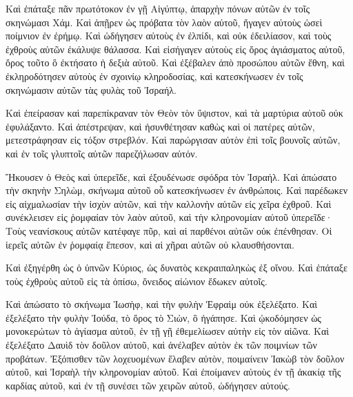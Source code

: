 {Καὶ ἐπάταξε πᾶν πρωτότοκον ἐν γῇ Αἰγύπτῳ, ἀπαρχὴν πόνων αὐτῶν ἐν τοῖς σκηνώμασι Χάμ.
Καὶ ἀπῇρεν ὡς πρόβατα τὸν λαὸν αὐτοῦ, ἤγαγεν αὐτοὺς ὡσεὶ ποίμνιον ἐν ἐρήμῳ.
Καὶ ὡδήγησεν αὐτοὺς ἐν ἐλπίδι, καὶ οὐκ ἐδειλίασον, καὶ τοὺς ἐχθροὺς αὐτῶν ἐκάλυψε θάλασσα.
Καὶ εἰσήγαγεν αὐτοὺς εἰς ὄρος ἁγιάσματος αὐτοῦ, ὄρος τοῦτο ὃ ἐκτήσατο ἡ δεξιὰ αὐτοῦ.
Καὶ ἐξέβαλεν ἀπὸ προσώπου αὐτῶν ἔθνη, καὶ ἐκληροδότησεν αὐτοὺς ἐν σχοινίῳ κληροδοσίας, καὶ κατεσκήνωσεν ἐν τοῖς σκηνώμασιν αὐτῶν τὰς φυλὰς τοῦ Ἰσραήλ.
\par }{\PP {}Καὶ ἐπείρασαν καὶ παρεπίκραναν τὸν Θεὸν τὸν ὕψιστον, καὶ τὰ μαρτύρια αὐτοῦ οὐκ ἐφυλάξαντο.
Καὶ ἀπέστρεψαν, καὶ ἠσυνθέτησαν καθὼς καὶ οἱ πατέρες αὐτῶν, μετεστράφησαν εἰς τόξον στρεβλόν.
Καὶ παρώργισαν αὐτὸν ἐπὶ τοῖς βουνοῖς αὐτῶν, καὶ ἐν τοῖς γλυπτοῖς αὐτῶν παρεζήλωσαν αὐτόν.
\par }{\PP {}Ἤκουσεν ὁ Θεὸς καὶ ὑπερεῖδε, καὶ ἐξουδένωσε σφόδρα τὸν Ἰσραήλ.
Καὶ ἀπώσατο τὴν σκηνὴν Σηλὼμ, σκήνωμα αὐτοῦ οὗ κατεσκήνωσεν ἐν ἀνθρώποις.
Καὶ παρέδωκεν εἰς αἰχμαλωσίαν τὴν ἰσχὺν αὐτῶν, καὶ τὴν καλλονὴν αὐτῶν εἰς χεῖρα ἐχθροῦ.
Καὶ συνέκλεισεν εἰς ῥομφαίαν τὸν λαὸν αὐτοῦ, καὶ τὴν κληρονομίαν αὐτοῦ ὑπερεῖδε·
Τοὺς νεανίσκους αὐτῶν κατέφαγε πῦρ, καὶ αἱ παρθένοι αὐτῶν οὐκ ἐπένθησαν.
Οἱ ἱερεῖς αὐτῶν ἐν ῥομφαίᾳ ἔπεσον, καὶ αἱ χῆραι αὐτῶν οὐ κλαυσθήσονται.
\par }{\PP {}Καὶ ἐξηγέρθη ὡς ὁ ὑπνῶν Κύριος, ὡς δυνατὸς κεκραιπαληκὼς ἐξ οἴνου.
Καὶ ἐπάταξε τοὺς ἐχθροὺς αὐτοῦ εἰς τὰ ὀπίσω, ὄνειδος αἰώνιον ἔδωκεν αὐτοῖς.
\par }{\PP {}Καὶ ἀπώσατο τὸ σκήνωμα Ἰωσὴφ, καὶ τὴν φυλὴν Ἐφραὶμ οὐκ ἐξελέξατο.
Καὶ ἐξελέξατο τὴν φυλὴν Ἰούδα, τὸ ὄρος τὸ Σιὼν, ὃ ἠγάπησε.
Καὶ ᾠκοδόμησεν ὡς μονοκερώτων τὸ ἁγίασμα αὐτοῦ, ἐν τῇ γῇ ἐθεμελίωσεν αὐτὴν εἰς τὸν αἰῶνα.
Καὶ ἐξελέξατο Δαυὶδ τὸν δοῦλον αὐτοῦ, καὶ ἀνέλαβεν αὐτὸν ἐκ τῶν ποιμνίων τῶν προβάτων.
Ἐξόπισθεν τῶν λοχευομένων ἔλαβεν αὐτὸν, ποιμαίνειν Ἰακὼβ τὸν δοῦλον αὐτοῦ, καὶ Ἰσραὴλ τὴν κληρονομίαν αὐτοῦ.
Καὶ ἐποίμανεν αὐτοὺς ἐν τῇ ἀκακίᾳ τῆς καρδίας αὐτοῦ, καὶ ἐν τῇ συνέσει τῶν χειρῶν αὐτοῦ, ὡδήγησεν αὐτούς.

}
